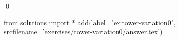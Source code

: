 
\begin{ex} 
  \label{ex:tower-variation0}
  
  \qed
\end{ex} 
\begin{python0}
from solutions import *
add(label="ex:tower-variation0",
    srcfilename='exercises/tower-variation0/answer.tex') 
\end{python0}
